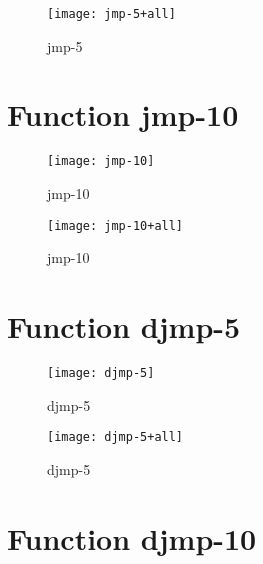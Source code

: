 \begin{center}
\begin{figure}[h]
\centering
\texttt{[image: jmp-5+all]}
\caption{jmp-5}
\end{figure}
\end{center}

\newpage

\section{Function jmp-10}
\begin{center}

\end{center}

\begin{center}
\begin{figure}[h]
\centering
\texttt{[image: jmp-10]}
\caption{jmp-10}
\end{figure}
\end{center}

\begin{center}
\begin{figure}[h]
\centering
\texttt{[image: jmp-10+all]}
\caption{jmp-10}
\end{figure}
\end{center}

\newpage

\section{Function djmp-5}
\begin{center}

\end{center}

\begin{center}
\begin{figure}[h]
\centering
\texttt{[image: djmp-5]}
\caption{djmp-5}
\end{figure}
\end{center}

\begin{center}
\begin{figure}[h]
\centering
\texttt{[image: djmp-5+all]}
\caption{djmp-5}
\end{figure}
\end{center}

\newpage

\section{Function djmp-10}
\begin{center}

\end{center}


